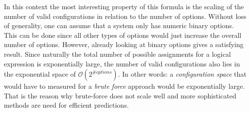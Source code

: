 In this context the most interesting property of this formula is the scaling of the number of valid configurations in relation to the number of options. Without loss of generality, one can assume that a system only has numeric binary options. This can be done since all other types of options would just increase the overall number of options. However, already looking at binary options gives a satisfying result. Since naturally the total number of possible assignments for a logical expression is exponentially large, the number of valid configurations also lies in the exponential space of $\mathcal{O}(2^{\#options})$. In other words: a \textit{configuration space} that would have to measured for a \textit{brute force} approach would be exponentially large. That is the reason why brute-force does not scale well and more sophisticated methods are need for efficient predictions.


